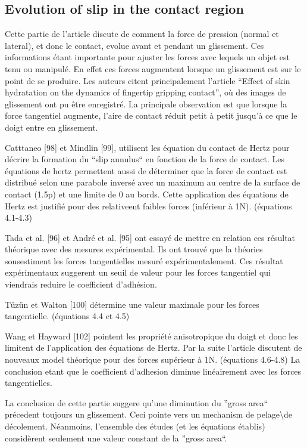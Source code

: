 
\subsection{Evolution of slip in the contact region}

Cette partie de l'article discute de comment la force de pression (normal et lateral), et donc le contact, evolue avant et pendant un glissement. 
Ces informations \'etant importante pour ajuster les forces avec lequels un objet est tenu ou manipul\'e. 
En effet ces forces augmentent lorsque un glissement est sur le point de se produire.
Les auteurs citent principalement l'article ``Effect of skin hydratation on the dynamics of fingertip gripping contact'',
où des images de glissement ont pu être enregistr\'e.
La principale observation est que lorsque la force tangentiel augmente, l'aire de contact r\'eduit petit à petit jusqu'à ce que le doigt entre en glissement.

Catttaneo [98] et Mindlin [99], utilisent les \'equation du contact de Hertz pour d\'ecrire la formation du ``slip annulus`` en fonction de la force de contact. 
Les \'equations de hertz permettent aussi de d\'eterminer que la force de contact est distribu\'e selon une parabole invers\'e avec un maximum au centre de la surface de contact (1.5p) et une limite de 0 au bords.
Cette application des \'equations de Hertz est justifi\'e pour des relativeent faibles forces (inf\'erieur à 1N).
(\'equations 4.1-4.3)

Tada et al. [96] et Andr\'e et al. [95] ont essay\'e de mettre en relation ces r\'esultat th\'eorique avec des mesures exp\'erimental. 
Ils ont trouv\'e que la th\'eories sousestiment les forces tangentielles mesur\'e exp\'erimentalement.
Ces r\'esultat exp\'erimentaux suggerent un seuil de valeur pour les forces tangentiel qui viendrais reduire le coefficient d'adh\'esion.

Tüzün et Walton [100] d\'etermine une valeur maximale pour les forces tangentielle. 
(\'equations 4.4 et 4.5)

Wang et Hayward [102] pointent les propri\'et\'e anisotropique du doigt et donc les limitent de l'application des \'equations de Hertz.
Par la suite l'article discutent de nouveaux model th\'eorique pour des forces sup\'erieur à 1N. 
(\'equations 4.6-4.8)
La conclusion etant que le coefficient d'adhesion diminue lin\'eairement avec les forces tangentielles.

La conclusion de cette partie suggere qu'une diminution du ''gross area`` pr\'ecedent toujours un glissement. 
Ceci pointe vers un mechanism de pelage\textbackslash de d\'ecolement.
N\'eanmoins, l'ensemble des \'etudes (et les \'equations \'etablis) considèrent seulement une valeur constant de la ''gross area``.

